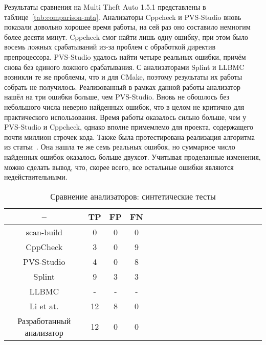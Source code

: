 Результаты сравнения на Multi Theft Auto 1.5.1 представлены в
таблице~\ref{tab:comparison-mta}. Анализаторы Cppcheck и PVS-Studio
вновь показали довольно хорошее время работы, на сей раз оно составило
немногим более десяти минут. Cppcheck смог найти лишь одну ошибку, при
этом было восемь ложных срабатываний из-за проблем с обработкой директив
препроцессора. PVS-Studio удалось найти четыре реальных ошибки, причём
снова без единого ложного срабатывания. С анализаторами Splint и LLBMC
возникли те же проблемы, что и для CMake, поэтому результаты их работы
собрать не получилось. Реализованный в рамках данной работы анализатор
нашёл на три ошибки больше, чем PVS-Studio. Вновь не обошлось без
небольшого числа неверно найденных ошибок, что в целом не критично для
практического использования. Время работы оказалось сильно больше, чем
у PVS-Studio и Cppcheck, однако вполне примемлемо для проекта,
содержащего почти миллион строчек кода. Также была протестирована
реализация алгоритма из статьи~\cite{li2010practical}. Она нашла те же
семь реальных ошибок, но суммарное число найденных ошибок оказалось
больше двухсот. Учитывая проделанные изменения, можно сделать вывод,
что, скорее всего, все остальные ошибки являются недействительными.

\begin{table}[!h]
\caption{Сравнение анализаторов: синтетические тесты}\label{tab:comparison-synthetic}
\centering
  \begin{tabular}{|*{18}{c|}}\hline
  --                       & TP  & FP & FN \\\hline
  scan-build               & 0   & 0  & 0  \\\hline
  CppCheck                 & 3   & 0  & 9  \\\hline
  PVS-Studio               & 4   & 0  & 8  \\\hline
  Splint                   & 9   & 3  & 3  \\\hline
  LLBMC                    & -   & -  & -  \\\hline
  Li et at.                & 12  & 8  & 0  \\\hline
  Разработанный анализатор & 12  & 0  & 0  \\\hline
  \end{tabular}
\end{table}

